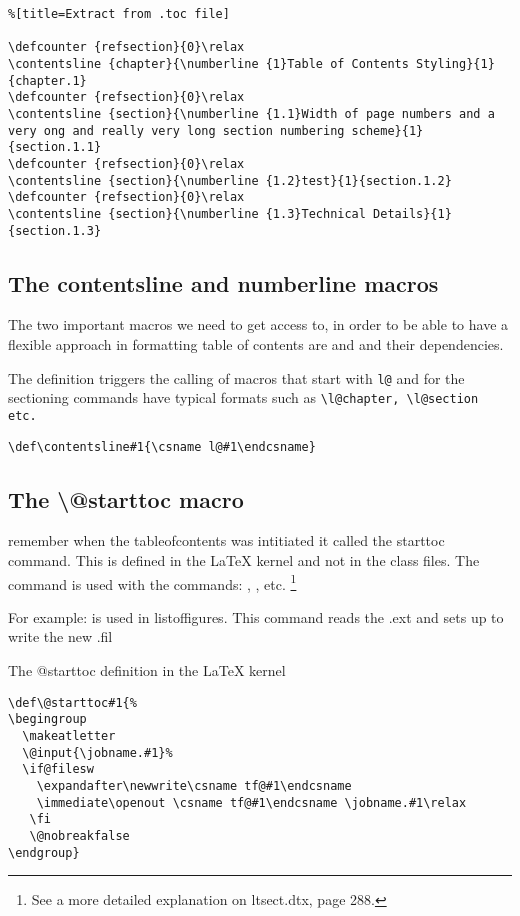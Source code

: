 \begin{lstlisting}%[title=Extract from .toc file]

\defcounter {refsection}{0}\relax
\contentsline {chapter}{\numberline {1}Table of Contents Styling}{1}{chapter.1}
\defcounter {refsection}{0}\relax
\contentsline {section}{\numberline {1.1}Width of page numbers and a very ong and really very long section numbering scheme}{1}{section.1.1}
\defcounter {refsection}{0}\relax
\contentsline {section}{\numberline {1.2}test}{1}{section.1.2}
\defcounter {refsection}{0}\relax
\contentsline {section}{\numberline {1.3}Technical Details}{1}{section.1.3}
\end{lstlisting}

\subsection{The contentsline and numberline macros}

The two important macros we need to get access to, in order to be able to have a flexible approach in formatting table of contents are  and  and their dependencies.

The  definition triggers the calling of macros that start with \verb+l@+ and for the sectioning commands have typical formats such as \lstinline{\l@chapter, \l@section etc.}

\begin{tcolorbox}
\begin{lstlisting}
\def\contentsline#1{\csname l@#1\endcsname}
\end{lstlisting}
\end{tcolorbox}

\subsection{The \textbackslash @starttoc macro}

remember when the tableofcontents was intitiated it called the starttoc command. This is defined in the LaTeX kernel and not in the class files. The  command is used with the commands:
, , etc. \footnote{See a more detailed explanation on ltsect.dtx, page 288.}

For example:  is used in listoffigures. This command
reads the .ext and sets up to write the new .fil

\begin{tcolorbox}{The @starttoc definition in the LaTeX kernel}
\begin{lstlisting}
\def\@starttoc#1{%
\begingroup
  \makeatletter
  \@input{\jobname.#1}%
  \if@filesw
    \expandafter\newwrite\csname tf@#1\endcsname
    \immediate\openout \csname tf@#1\endcsname \jobname.#1\relax
   \fi
   \@nobreakfalse
\endgroup}
\end{lstlisting}
\end{tcolorbox}

